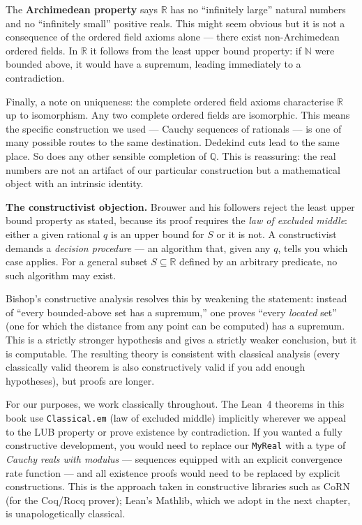 \documentclass[12pt, openany]{book}
\theoremstyle{plain}
\theoremstyle{definition}
\theoremstyle{remark}
\newcommand{\N}{\mathbb{N}}
\newcommand{\Q}{\mathbb{Q}}
\newcommand{\R}{\mathbb{R}}
\begin{document}
The \textbf{Archimedean property} says $\R$ has no ``infinitely large'' natural numbers and no ``infinitely small'' positive reals.  This might seem obvious but it is not a consequence of the ordered field axioms alone --- there exist non-Archimedean ordered fields.  In $\R$ it follows from the least upper bound property: if $\N$ were bounded above, it would have a supremum, leading immediately to a contradiction.

Finally, a note on uniqueness: the complete ordered field axioms characterise $\R$ up to isomorphism.  Any two complete ordered fields are isomorphic.  This means the specific construction we used --- Cauchy sequences of rationals --- is one of many possible routes to the same destination.  Dedekind cuts lead to the same place.  So does any other sensible completion of $\Q$.  This is reassuring: the real numbers are not an artifact of our particular construction but a mathematical object with an intrinsic identity.

\medskip
\textbf{The constructivist objection.} Brouwer and his followers reject the least upper bound property as stated, because its proof requires the \emph{law of excluded middle}: either a given rational $q$ is an upper bound for $S$ or it is not. A constructivist demands a \emph{decision procedure} --- an algorithm that, given any $q$, tells you which case applies. For a general subset $S \subseteq \R$ defined by an arbitrary predicate, no such algorithm may exist.

Bishop's constructive analysis resolves this by weakening the statement: instead of ``every bounded-above set has a supremum,'' one proves ``every \emph{located} set'' (one for which the distance from any point can be computed) has a supremum. This is a strictly stronger hypothesis and gives a strictly weaker conclusion, but it is computable. The resulting theory is consistent with classical analysis (every classically valid theorem is also constructively valid if you add enough hypotheses), but proofs are longer.

For our purposes, we work classically throughout. The Lean~4 theorems in this book use \texttt{Classical.em} (law of excluded middle) implicitly wherever we appeal to the LUB property or prove existence by contradiction. If you wanted a fully constructive development, you would need to replace our \texttt{MyReal} with a type of \emph{Cauchy reals with modulus} --- sequences equipped with an explicit convergence rate function --- and all existence proofs would need to be replaced by explicit constructions. This is the approach taken in constructive libraries such as CoRN (for the Coq/Rocq prover); Lean's Mathlib, which we adopt in the next chapter, is unapologetically classical.
\end{document}
